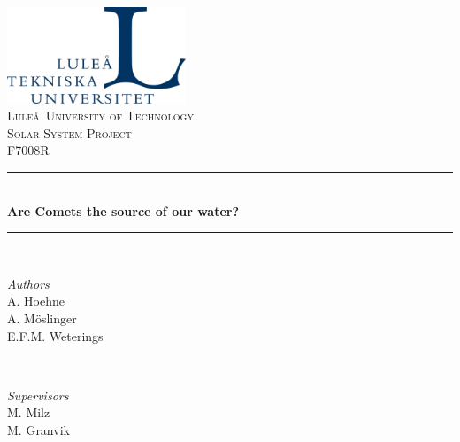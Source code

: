 
\begin{titlepage} %
	\center %
	\newcommand{\HRule}{\rule{\linewidth}{0.5mm}} %
	
	
	\includegraphics[width=0.4\textwidth]{figures/LTU_logo.jpg}\\[1cm]
		
	
	\textsc{\Huge Lule\aa \ University of Technology}\\[1.5cm]
	
	\textsc{\LARGE Solar System Project}\\[0.3cm]
	
	\textsc{\large F7008R}\\[0.5cm]
	
	
	\HRule\\[0.4cm]
	
	{\Huge\bfseries Are Comets the source of our water?}\\[0.4cm]
	
	\HRule\\[1.5cm]
	
	
	\begin{minipage}{0.4\textwidth}
		\begin{flushleft}
			\large
			\textit{Authors}\\
			A. Hoehne\\
			A. M\"{o}slinger\\
			E.F.M. Weterings
		\end{flushleft}
	\end{minipage}
	~
	\begin{minipage}{0.4\textwidth}
		\begin{flushright}
			\large
			\textit{Supervisors}\\
			M. Milz\\
			M. Granvik\\
		\end{flushright}
	\end{minipage}
	

\end{titlepage}
